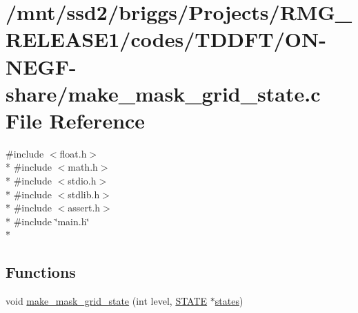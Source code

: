 \hypertarget{_t_d_d_f_t_2_o_n-_n_e_g_f-share_2make__mask__grid__state_8c}{\section{/mnt/ssd2/briggs/\-Projects/\-R\-M\-G\-\_\-\-R\-E\-L\-E\-A\-S\-E1/codes/\-T\-D\-D\-F\-T/\-O\-N-\/\-N\-E\-G\-F-\/share/make\-\_\-mask\-\_\-grid\-\_\-state.c File Reference}
\label{_t_d_d_f_t_2_o_n-_n_e_g_f-share_2make__mask__grid__state_8c}
}
{\ttfamily \#include $<$float.\-h$>$}\\*
{\ttfamily \#include $<$math.\-h$>$}\\*
{\ttfamily \#include $<$stdio.\-h$>$}\\*
{\ttfamily \#include $<$stdlib.\-h$>$}\\*
{\ttfamily \#include $<$assert.\-h$>$}\\*
{\ttfamily \#include \char`\"{}main.\-h\char`\"{}}\\*
\subsection*{Functions}
\begin{DoxyCompactItemize}
\item 
void \hyperlink{_t_d_d_f_t_2_o_n-_n_e_g_f-share_2make__mask__grid__state_8c_ae2ef57cf235a2dadd0d26631747fb624}{make\-\_\-mask\-\_\-grid\-\_\-state} (int level, \hyperlink{struct_s_t_a_t_e}{S\-T\-A\-T\-E} $\ast$\hyperlink{md_8h_a286ebf6b996d2b1827eb9a889dfc83d7}{states})
\end{DoxyCompactItemize}


